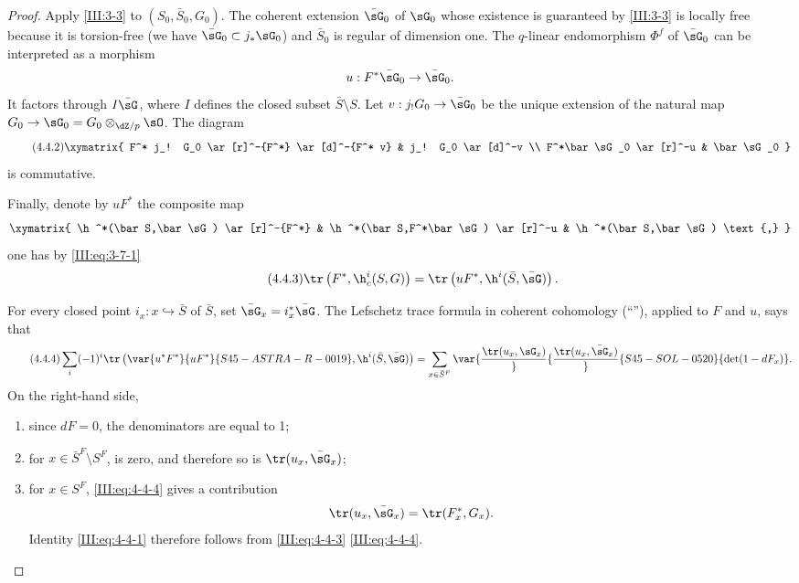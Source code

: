 \begin{proof}
Apply \ref{III:3-3} to $(S_0,\bar S_0,G_0)$. The coherent extension
$\bar\sG_0$ of $\sG_0$ whose existence is guaranteed by \ref{III:3-3} is
locally free because it is torsion-free (we have
$\bar\sG_0\subset j_*\sG_0$) and $\bar S_0$ is regular of dimension one. The
$q$-linear endomorphism $\Phi^f$ of $\bar\sG_0$ can be interpreted as a
morphism
\[
  u : F^*\bar\sG_0 \to \bar\sG_0 \text{.}
\]
It factors through $I\bar\sG$, where $I$ defines the closed subset
$\bar S\setminus S$. Let $v:j_!G_0 \to \bar\sG_0$ be the unique extension of
the natural map $G_0 \to \sG_0 = G_0\otimes_{\dZ/p}\sO$. The diagram
\begin{equation*}\tag{4.4.2}\label{III:eq:4-4-2}
\xymatrix{
  F^* j_! G_0 \ar[r]^-{F^*} \ar[d]^-{F^* v}
    & j_! G_0 \ar[d]^-v \\
  F^*\bar \sG_0 \ar[r]^-u
    & \bar\sG_0
}
\end{equation*}
is commutative.

Finally, denote by $u F^*$ the composite map
\[\xymatrix{
  \h^*(\bar S,\bar\sG) \ar[r]^-{F^*}
    & \h^*(\bar S,F^*\bar\sG) \ar[r]^-u
    & \h^*(\bar S,\bar\sG) \text{,}
}\]
one has by \eqref{III:eq:3-7-1}
\begin{equation*}\tag{4.4.3}\label{III:eq:4-4-3}
  \tr\left(F^*,\h_c^i(S,G)\right) = \tr\left(u F^*,\h^i(\bar S,\bar\sG)\right) \text{.}
\end{equation*}

For every closed point $i_x:x\hookrightarrow \bar S$ of $\bar S$, set
$\bar\sG_x = i_x^*\bar\sG$. The Lefschetz trace formula in coherent
cohomology (``''), applied to $F$ and $u$, says
that
\begin{equation*}\tag{4.4.4}\label{III:eq:4-4-4}
  \sum_i (-1)^i \tr\left(\var{u^* F^*}{u F^*}{S45-ASTRA-R-0019}, \h^i(\bar S,\bar\sG)\right) = \sum_{x\in \bar S^F} \var{\frac{\tr(u_x,\sG_x)}}{\frac{\tr(u_x,\bar\sG_x)}}{S45-SOL-0520}{\det(1-d F_x)} \text{.}
\end{equation*}
On the right-hand side,
\begin{enumerate}[\indent a)]
  \item since $d F=0$, the denominators are equal to 1;
  \item for $x\in \bar S^F\setminus S^F$,  is zero, and therefore so is $\tr(u_x,\bar\sG_x)$;
  \item for $x\in S^F$, \eqref{III:eq:4-4-4} gives a contribution
    \[
      \tr(u_x,\bar\sG_x) = \tr(F_x^*,G_x) \text{.}
    \]
    Identity \eqref{III:eq:4-4-1} therefore follows from
    \eqref{III:eq:4-4-3} \eqref{III:eq:4-4-4}.
\end{enumerate}
\end{proof}






